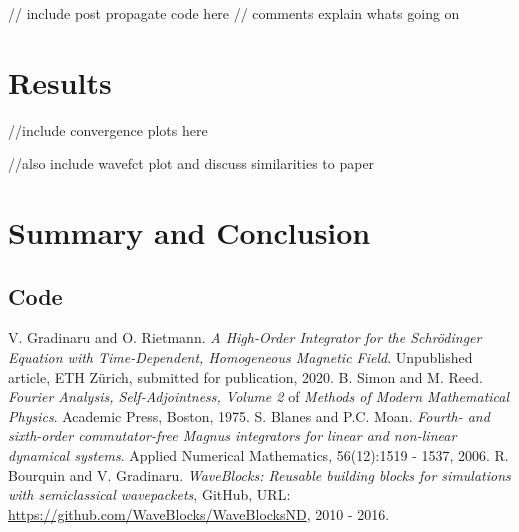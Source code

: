 \documentclass{article}
\begin{document}
// include post propagate code here 
// comments explain whats going on

\section{Results}

//include convergence plots here

//also include wavefct plot and discuss similarities to paper

\section{Summary and Conclusion}

\begin{appendices}


\section{Code} \label{appendix:code}

\lstset{style=mystyle}





\end{appendices}


\begin{thebibliography}{9}
  V. Gradinaru and O. Rietmann.
  \textit{A High-Order Integrator for the
          Schr{\"o}dinger Equation with Time-Dependent,
          Homogeneous Magnetic Field}.
  Unpublished article, ETH Z{\"u}rich, submitted for publication, 2020.
  B. Simon and M. Reed.
  \textit{Fourier Analysis, Self-Adjointness, Volume 2} of \textit{Methods of Modern Mathematical Physics}.
  Academic Press, Boston, 1975.
  S. Blanes and P.C. Moan.
  \textit{Fourth- and sixth-order commutator-free Magnus integrators for linear and non-linear dynamical systems}.
  Applied Numerical Mathematics, 56(12):1519 - 1537, 2006.
  R. Bourquin and V. Gradinaru.
  \textit{{WaveBlocks}: Reusable building blocks for simulations with semiclassical wavepackets},
  GitHub, URL: \url{https://github.com/WaveBlocks/WaveBlocksND},
  2010 - 2016.

\end{thebibliography}
\end{document}
